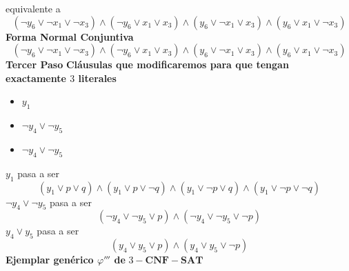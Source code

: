 \documentclass[a4paper]{article}
\begin{document}
equivalente a
\[
    \left(\neg y_{6} \lor \neg x_{1} \lor \neg x_{3}\right) \land \left(\neg y_{6} \lor x_{1} \lor x_{3}\right) \land
    \left(y_{6} \lor \neg x_{1} \lor x_{3}\right) \land \left(y_{6} \lor x_{1} \lor \neg x_{3}\right)
\]
\textbf{Forma Normal Conjuntiva}
\[
    \left(\neg y_{6} \lor \neg x_{1} \lor \neg x_{3}\right) \land \left(\neg y_{6} \lor x_{1} \lor x_{3}\right) \land
    \left(y_{6} \lor \neg x_{1} \lor x_{3}\right) \land \left(y_{6} \lor x_{1} \lor \neg x_{3}\right)
\]
\textbf{Tercer Paso}
\newline 
\textbf{Cláusulas que modificaremos para que tengan exactamente \(3\) literales}
\begin{itemize}
    \item \(y_{1}\)
    \item \(\neg y_{4} \lor \neg y_{5}\)
    \item \(\neg y_{4} \lor \neg y_{5}\)
\end{itemize}
\(y_{1}\) pasa a ser 
\[
    \left(y_{1} \lor p \lor q\right) \land \left(y_{1} \lor p \lor \neg q\right) \land \left(y_{1} \lor \neg p \lor q\right) \land \left(y_{1} \lor \neg p \lor \neg q\right)
\]
\(\neg y_{4} \lor \neg y_{5}\) pasa a ser 
\[
    \left(\neg y_{4} \lor \neg y_{5} \lor p\right) \land \left(\neg y_{4} \lor \neg y_{5} \lor \neg p\right)
\]
\(y_{4} \lor y_{5}\) pasa a ser 
\[
    \left(y_{4} \lor y_{5} \lor p\right) \land \left(y_{4} \lor y_{5} \lor \neg p\right)
\]
\textbf{Ejemplar genérico \(\varphi'''\) de} \(3-\mathbf{CNF-SAT}\)
\end{document}
